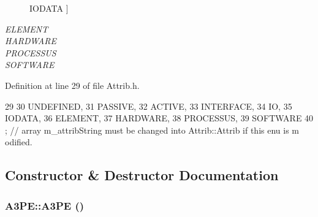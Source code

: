 \begin{Desc}
\begin{description}
{\hypertarget{classAttrib_a69e171d7cc6417835a5a306d3c764235a0af3b0d0ac323c1704e6c69cf90add28}{
IODATA}
\label{classAttrib_a69e171d7cc6417835a5a306d3c764235a0af3b0d0ac323c1704e6c69cf90add28}
}]\item[{\em 
\hypertarget{classAttrib_a69e171d7cc6417835a5a306d3c764235a7788bc5dd333fd8ce18562b269c9dab1}{
ELEMENT}
\label{classAttrib_a69e171d7cc6417835a5a306d3c764235a7788bc5dd333fd8ce18562b269c9dab1}
}]\item[{\em 
\hypertarget{classAttrib_a69e171d7cc6417835a5a306d3c764235a61ceb22149f365f1780d18f9d1459423}{
HARDWARE}
\label{classAttrib_a69e171d7cc6417835a5a306d3c764235a61ceb22149f365f1780d18f9d1459423}
}]\item[{\em 
\hypertarget{classAttrib_a69e171d7cc6417835a5a306d3c764235a75250e29692496e73effca2c0330977f}{
PROCESSUS}
\label{classAttrib_a69e171d7cc6417835a5a306d3c764235a75250e29692496e73effca2c0330977f}
}]\item[{\em 
\hypertarget{classAttrib_a69e171d7cc6417835a5a306d3c764235a103a67cd0b8f07ef478fa45d4356e27b}{
SOFTWARE}
\label{classAttrib_a69e171d7cc6417835a5a306d3c764235a103a67cd0b8f07ef478fa45d4356e27b}
}]\end{description}
\end{Desc}



Definition at line 29 of file Attrib.h.


\begin{DoxyCode}
29                 {
30     UNDEFINED,
31     PASSIVE,
32     ACTIVE,
33     INTERFACE,
34     IO,
35     IODATA,
36     ELEMENT,
37     HARDWARE,
38     PROCESSUS,
39     SOFTWARE 
40   }; // array m_attribString must be changed into Attrib::Attrib if this enu is m
      odified. 
\end{DoxyCode}


\subsection{Constructor \& Destructor Documentation}
\hypertarget{classA3PE_ae3e49a43c661f5e9c1b0edaee14fc297}{
\subsubsection[{A3PE}]{\setlength{\rightskip}{0pt plus 5cm}A3PE::A3PE ()}}
\label{classA3PE_ae3e49a43c661f5e9c1b0edaee14fc297}


